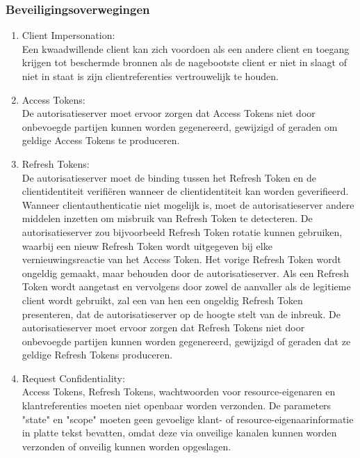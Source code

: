 \subsubsection{Beveiligingsoverwegingen}
\label{subsubsec:beveiligingsoverwegingen}
\begin{enumerate}[label=\textbf{-}]
    \item Client Impersonation: \\
    Een kwaadwillende client kan zich voordoen als een andere client en toegang krijgen tot beschermde bronnen als de nagebootste client er niet in slaagt of niet in staat is zijn clientreferenties vertrouwelijk te houden.

    \item Access Tokens: \\
    De autorisatieserver moet ervoor zorgen dat Access Tokens niet door onbevoegde partijen kunnen worden gegenereerd, gewijzigd of geraden om geldige Access Tokens te produceren.

    \item Refresh Tokens: \\
    De autorisatieserver moet de binding tussen het Refresh Token en de clientidentiteit verifiëren wanneer de clientidentiteit kan worden geverifieerd. Wanneer clientauthenticatie niet mogelijk is, moet de autorisatieserver andere middelen inzetten om misbruik van Refresh Token te detecteren. De autorisatieserver zou bijvoorbeeld Refresh Token rotatie kunnen gebruiken, waarbij een nieuw Refresh Token wordt uitgegeven bij elke vernieuwingsreactie van het Access Token. Het vorige Refresh Token wordt ongeldig gemaakt, maar behouden door de autorisatieserver. Als een Refresh Token wordt aangetast en vervolgens door zowel de aanvaller als de legitieme client wordt gebruikt, zal een van hen een ongeldig Refresh Token presenteren, dat de autorisatieserver op de hoogte stelt van de inbreuk. De autorisatieserver moet ervoor zorgen dat Refresh Tokens niet door onbevoegde partijen kunnen worden gegenereerd, gewijzigd of geraden dat ze geldige Refresh Tokens produceren.

    \item Request Confidentiality: \\
    Access Tokens, Refresh Tokens, wachtwoorden voor resource-eigenaren en klantreferenties moeten niet openbaar worden verzonden. De parameters "state" en "scope" moeten geen gevoelige klant- of resource-eigenaarinformatie in platte tekst bevatten, omdat deze via onveilige kanalen kunnen worden verzonden of onveilig kunnen worden opgeslagen.
\end{enumerate}



